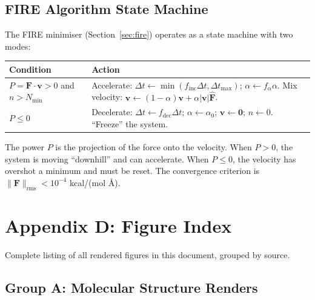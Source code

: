 \documentclass[11pt,a4paper]{article}
\begin{document}
\subsection{FIRE Algorithm State Machine}

The FIRE minimiser (Section~\ref{sec:fire}) operates as a state machine
with two modes:

\begin{center}
\begin{tabular}{lp{10cm}}
\toprule
\textbf{Condition} & \textbf{Action} \\
\midrule
$P = \mathbf{F} \cdot \mathbf{v} > 0$ and $n > N_{\min}$ &
  Accelerate: $\Delta t \gets \min(f_{\text{inc}} \Delta t, \Delta t_{\max})$;
  $\alpha \gets f_\alpha \alpha$.  Mix velocity:
  $\mathbf{v} \gets (1-\alpha)\mathbf{v} + \alpha |\mathbf{v}| \hat{\mathbf{F}}$. \\
$P \leq 0$ &
  Decelerate: $\Delta t \gets f_{\text{dec}} \Delta t$; $\alpha \gets \alpha_0$;
  $\mathbf{v} \gets \mathbf{0}$; $n \gets 0$.  ``Freeze'' the system. \\
\bottomrule
\end{tabular}
\end{center}

\noindent The power $P$ is the projection of the force onto the
velocity.  When $P > 0$, the system is moving ``downhill'' and can
accelerate.  When $P \leq 0$, the velocity has overshot a minimum
and must be reset.  The convergence criterion is
$\|\mathbf{F}\|_{\text{rms}} < 10^{-4}$ kcal/(mol \AA).

\section{Appendix D: Figure Index}
\label{sec:appendix_figs}

Complete listing of all rendered figures in this document, grouped by
source.

\subsection{Group A: Molecular Structure Renders}
\end{document}
